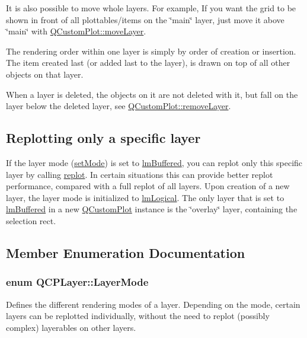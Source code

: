 It is also possible to move whole layers. For example, If you want the grid to be shown in front of all plottables/items on the \char`\"{}main\char`\"{} layer, just move it above \char`\"{}main\char`\"{} with \hyperlink{class_q_custom_plot_ae896140beff19424e9e9e02d6e331104}{Q\+Custom\+Plot\+::move\+Layer}.

The rendering order within one layer is simply by order of creation or insertion. The item created last (or added last to the layer), is drawn on top of all other objects on that layer.

When a layer is deleted, the objects on it are not deleted with it, but fall on the layer below the deleted layer, see \hyperlink{class_q_custom_plot_a40f75e342c5eaab6a86066a42a0e2a94}{Q\+Custom\+Plot\+::remove\+Layer}.\hypertarget{class_q_c_p_layer_qcplayer-buffering}{}\subsection{Replotting only a specific layer}\label{class_q_c_p_layer_qcplayer-buffering}
If the layer mode (\hyperlink{class_q_c_p_layer_a938d57b04f4e4c23cedf1711f983919b}{set\+Mode}) is set to \hyperlink{class_q_c_p_layer_a67dcfc1590be2a1f2227c5a39bb59c7cada274b1644a2a3c1b794c052f1601bb2}{lm\+Buffered}, you can replot only this specific layer by calling \hyperlink{class_q_c_p_layer_adefd53b6db02f470151c416f42e37180}{replot}. In certain situations this can provide better replot performance, compared with a full replot of all layers. Upon creation of a new layer, the layer mode is initialized to \hyperlink{class_q_c_p_layer_a67dcfc1590be2a1f2227c5a39bb59c7ca6294b5ed9040aede762c626f5108f934}{lm\+Logical}. The only layer that is set to \hyperlink{class_q_c_p_layer_a67dcfc1590be2a1f2227c5a39bb59c7cada274b1644a2a3c1b794c052f1601bb2}{lm\+Buffered} in a new \hyperlink{class_q_custom_plot}{Q\+Custom\+Plot} instance is the \char`\"{}overlay\char`\"{} layer, containing the selection rect. 

\subsection{Member Enumeration Documentation}
\subsubsection[{\texorpdfstring{Layer\+Mode}{LayerMode}}]{\setlength{\rightskip}{0pt plus 5cm}enum {\bf Q\+C\+P\+Layer\+::\+Layer\+Mode}}\hypertarget{class_q_c_p_layer_a67dcfc1590be2a1f2227c5a39bb59c7c}{}\label{class_q_c_p_layer_a67dcfc1590be2a1f2227c5a39bb59c7c}
Defines the different rendering modes of a layer. Depending on the mode, certain layers can be replotted individually, without the need to replot (possibly complex) layerables on other layers.

